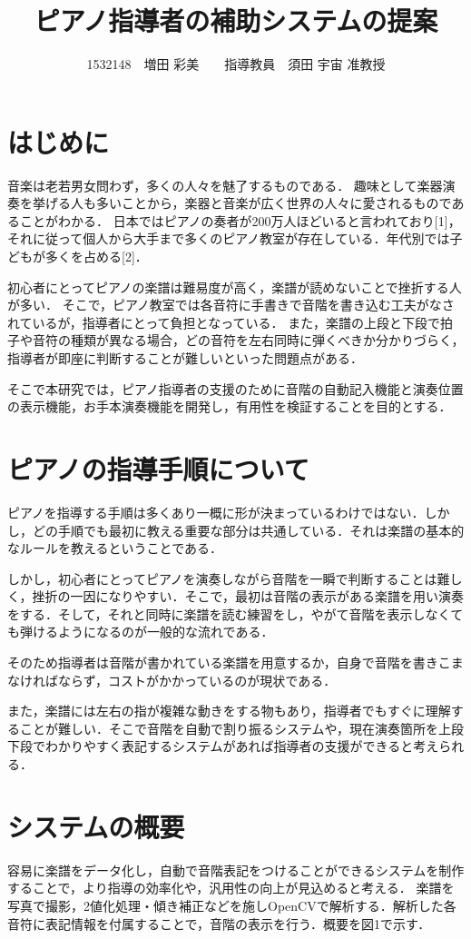 \documentclass[twocolumn,10pt,a4j]{jsarticle}
\title{ピアノ指導者の補助システムの提案}
\author{1532148　増田 彩美　　指導教員　須田 宇宙 准教授}
\date{}
\begin{document}
\maketitle

\section{はじめに}

音楽は老若男女問わず，多くの人々を魅了するものである．
趣味として楽器演奏を挙げる人も多いことから，楽器と音楽が広く世界の人々に愛されるものであることがわかる．
日本ではピアノの奏者が200万人ほどいると言われており[1]，それに従って個人から大手まで多くのピアノ教室が存在している．年代別では子どもが多くを占める[2]．

初心者にとってピアノの楽譜は難易度が高く，楽譜が読めないことで挫折する人が多い．
そこで，ピアノ教室では各音符に手書きで音階を書き込む工夫がなされているが，指導者にとって負担となっている．
また，楽譜の上段と下段で拍子や音符の種類が異なる場合，どの音符を左右同時に弾くべきか分かりづらく，指導者が即座に判断することが難しいといった問題点がある．

そこで本研究では，ピアノ指導者の支援のために音階の自動記入機能と演奏位置の表示機能，お手本演奏機能を開発し，有用性を検証することを目的とする．


\section{ピアノの指導手順について}
ピアノを指導する手順は多くあり一概に形が決まっているわけではない．しかし，どの手順でも最初に教える重要な部分は共通している．それは楽譜の基本的なルールを教えるということである．

しかし，初心者にとってピアノを演奏しながら音階を一瞬で判断することは難しく，挫折の一因になりやすい．そこで，最初は音階の表示がある楽譜を用い演奏をする．そして，それと同時に楽譜を読む練習をし，やがて音階を表示しなくても弾けるようになるのが一般的な流れである．

そのため指導者は音階が書かれている楽譜を用意するか，自身で音階を書きこまなければならず，コストがかかっているのが現状である．

また，楽譜には左右の指が複雑な動きをする物もあり，指導者でもすぐに理解することが難しい．そこで音階を自動で割り振るシステムや，現在演奏箇所を上段下段でわかりやすく表記するシステムがあれば指導者の支援ができると考えられる．

\section{システムの概要}
容易に楽譜をデータ化し，自動で音階表記をつけることができるシステムを制作することで，より指導の効率化や，汎用性の向上が見込めると考える．
楽譜を写真で撮影，2値化処理・傾き補正などを施しOpenCVで解析する．解析した各音符に表記情報を付属することで，音階の表示を行う．概要を図1で示す．
\end{document}
